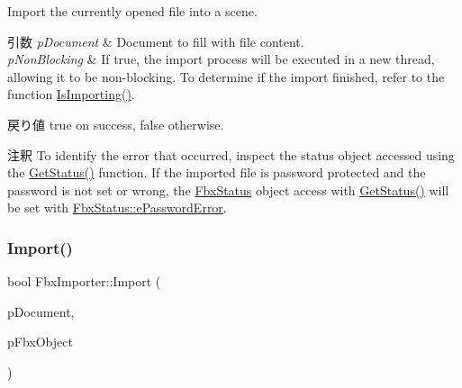 Import the currently opened file into a scene. 
\begin{DoxyParams}{引数}
{\em p\+Document} & Document to fill with file content. \\
\hline
{\em p\+Non\+Blocking} & If true, the import process will be executed in a new thread, allowing it to be non-\/blocking. To determine if the import finished, refer to the function \hyperlink{class_fbx_importer_a8146a9982be07e4e287eb17b1c291c0b}{Is\+Importing()}. \\
\hline
\end{DoxyParams}
\begin{DoxyReturn}{戻り値}
{\ttfamily true} on success, {\ttfamily false} otherwise. 
\end{DoxyReturn}
\begin{DoxyRemark}{注釈}
To identify the error that occurred, inspect the status object accessed using the \hyperlink{class_fbx_i_o_base_a078e47a99b119278ca3ee639e2da5b6d}{Get\+Status()} function. If the imported file is password protected and the password is not set or wrong, the \hyperlink{class_fbx_status}{Fbx\+Status} object access with \hyperlink{class_fbx_i_o_base_a078e47a99b119278ca3ee639e2da5b6d}{Get\+Status()} will be set with \hyperlink{class_fbx_status_a6a631d5d95b28e31a19aabd5f5809eccaac3f30237566cb5a030bc0366afb5131}{Fbx\+Status\+::e\+Password\+Error}. 
\end{DoxyRemark}
\mbox{\label{class_fbx_importer_a04bd6be7ae002ef88084e50ef4b43164}} 
\subsubsection{\texorpdfstring{Import()}{Import()}\hspace{0.1cm}{\footnotesize\ttfamily [2/2]}}
{\footnotesize\ttfamily bool Fbx\+Importer\+::\+Import (\begin{DoxyParamCaption}\item[{\hyperlink{class_fbx_document}{Fbx\+Document} $\ast$}]{p\+Document,  }\item[{\hyperlink{class_fbx_i_o}{Fbx\+IO} $\ast$}]{p\+Fbx\+Object }\end{DoxyParamCaption})\hspace{0.3cm}{\ttfamily [protected]}}

\mbox{\label{class_fbx_importer_a70528a9ca1ff737bda9696a2073acd13}} 
